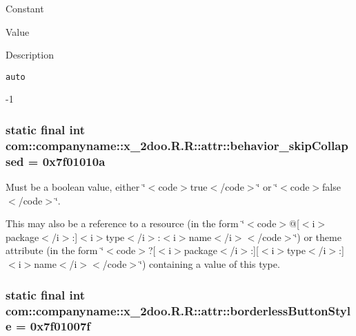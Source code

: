 Constant

Value

Description 

{\tt auto}

-1\hypertarget{classcom_1_1companyname_1_1x__2doo_1_1_r_1_1attr_71d19c3cd89650a80b96c2bb2a1c51a7}{
\subsubsection[{behavior\_\-skipCollapsed}]{\setlength{\rightskip}{0pt plus 5cm}static final int com::companyname::x\_\-2doo.R.R::attr::behavior\_\-skipCollapsed = 0x7f01010a}}
\label{classcom_1_1companyname_1_1x__2doo_1_1_r_1_1attr_71d19c3cd89650a80b96c2bb2a1c51a7}


Must be a boolean value, either \char`\"{}$<$code$>$true$<$/code$>$\char`\"{} or \char`\"{}$<$code$>$false$<$/code$>$\char`\"{}. 

This may also be a reference to a resource (in the form \char`\"{}$<$code$>$@\mbox{[}$<$i$>$package$<$/i$>$:\mbox{]}$<$i$>$type$<$/i$>$:$<$i$>$name$<$/i$>$$<$/code$>$\char`\"{}) or theme attribute (in the form \char`\"{}$<$code$>$?\mbox{[}$<$i$>$package$<$/i$>$:\mbox{]}\mbox{[}$<$i$>$type$<$/i$>$:\mbox{]}$<$i$>$name$<$/i$>$$<$/code$>$\char`\"{}) containing a value of this type. \hypertarget{classcom_1_1companyname_1_1x__2doo_1_1_r_1_1attr_025794b28929d5f8d3f3dfdcf729474b}{
\subsubsection[{borderlessButtonStyle}]{\setlength{\rightskip}{0pt plus 5cm}static final int com::companyname::x\_\-2doo.R.R::attr::borderlessButtonStyle = 0x7f01007f}}
\label{classcom_1_1companyname_1_1x__2doo_1_1_r_1_1attr_025794b28929d5f8d3f3dfdcf729474b}


